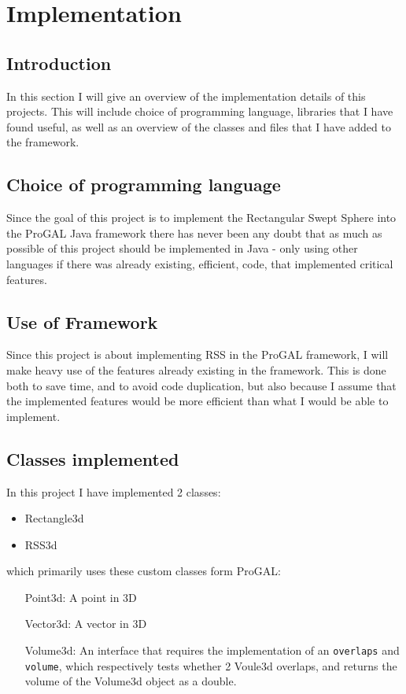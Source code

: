 
\section{Implementation}
\label{implementation}

\subsection{Introduction}
In this section I will give an overview of the implementation details of this projects. This will include choice of programming language, libraries that I have found useful, as well as an overview of the classes and files that I have added to the framework.

\subsection{Choice of programming language}
Since the goal of this project is to implement the Rectangular Swept Sphere into the ProGAL Java framework there has never been any doubt that as much as possible of this project should be implemented in Java - only using other languages if there was already existing, efficient, code, that implemented critical features.

\subsection{Use of Framework}
Since this project is about implementing RSS in the ProGAL framework, I will make heavy use of the features already existing in the framework. This is done both to save time, and to avoid code duplication, but also because I assume that the implemented features would be more efficient than what I would be able to implement.

\subsection{Classes implemented}
In this project I have implemented 2 classes:
\begin{itemize}
\item Rectangle3d
\item RSS3d
\end{itemize}

which primarily uses these custom classes form ProGAL:

\begin{itemize}
\item[Point3d:] A point in 3D
\item[Vector3d:] A vector in 3D
\item[Volume3d:] An interface that requires the implementation of an \texttt{overlaps} and \texttt{volume}, which respectively tests whether 2 Voule3d overlaps, and returns the volume of the Volume3d object as a double.
\end{itemize}

